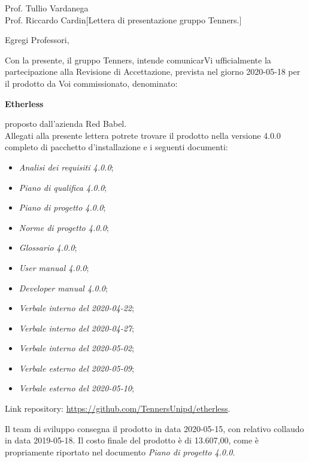 \begin{letter}{Prof. Tullio Vardanega \\Prof. Riccardo Cardin}[Lettera di presentazione gruppo Tenners.]
\opening[Padova, ]{Egregi Professori,}
	Con la presente, il gruppo Tenners, intende comunicarVi ufficialmente la partecipazione alla Revisione di Accettazione, prevista nel giorno 2020-05-18 per il prodotto da Voi commissionato, denominato:
	\begin{center}
		\textbf{Etherless}
	\end{center}
    proposto dall'azienda Red Babel.\\
    \noindent Allegati alla presente lettera potrete trovare il prodotto nella versione 4.0.0 completo di pacchetto d'installazione e i seguenti documenti:
    \begin{itemize}
    	\item \textit{Analisi dei requisiti 4.0.0}\docs;
    	\item \textit{Piano di qualifica 4.0.0}\docs;
    	\item \textit{Piano di progetto 4.0.0}\docs;
    	\item \textit{Norme di progetto 4.0.0}\docs;
    	\item \textit{Glossario 4.0.0}\docs;
    	\item \textit{User manual 4.0.0}\docs;
    	\item \textit{Developer manual 4.0.0}\docs;
    	\item \textit{Verbale interno del 2020-04-22}\docs;
    	\item \textit{Verbale interno del 2020-04-27}\docs;
    	\item \textit{Verbale interno del 2020-05-02}\docs;
    	\item \textit{Verbale esterno del 2020-05-09}\docs;
    	\item \textit{Verbale esterno del 2020-05-10}\docs;
    	
    \end{itemize}
	Link repository: \url{https://github.com/TennersUnipd/etherless}.
	
	\noindent Il team di sviluppo consegna il prodotto in data 2020-05-15, con relativo collaudo in data 2019-05-18. Il costo finale del prodotto è di 13.607,00\officialeuro, come è propriamente riportato nel documento \textit{Piano di progetto 4.0.0}\docs.
	

\end{letter}
